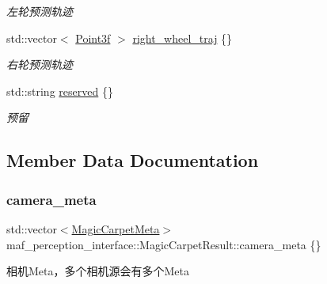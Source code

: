 \begin{DoxyCompactItemize}
\begin{DoxyCompactList}\small\item\em 左轮预测轨迹 \end{DoxyCompactList}\item 
std\+::vector$<$ \hyperlink{structmaf__perception__interface_1_1Point3f}{Point3f} $>$ \hyperlink{structmaf__perception__interface_1_1MagicCarpetResult_a310792355df64c11094628534f79d042}{right\+\_\+wheel\+\_\+traj} \{\}
\begin{DoxyCompactList}\small\item\em 右轮预测轨迹 \end{DoxyCompactList}\item 
std\+::string \hyperlink{structmaf__perception__interface_1_1MagicCarpetResult_aa5ee38fc1e76d77d3baace0530b2afc9}{reserved} \{\}
\begin{DoxyCompactList}\small\item\em 预留 \end{DoxyCompactList}\end{DoxyCompactItemize}


\subsection{Member Data Documentation}
\mbox{\label{structmaf__perception__interface_1_1MagicCarpetResult_a8789b70501b926a9abe9501acf96c323}} 
\subsubsection{\texorpdfstring{camera\+\_\+meta}{camera\_meta}}
{\footnotesize\ttfamily std\+::vector$<$\hyperlink{structmaf__perception__interface_1_1MagicCarpetMeta}{Magic\+Carpet\+Meta}$>$ maf\+\_\+perception\+\_\+interface\+::\+Magic\+Carpet\+Result\+::camera\+\_\+meta \{\}}



相机\+Meta，多个相机源会有多个\+Meta 

\mbox{\label{structmaf__perception__interface_1_1MagicCarpetResult_a98ccdffc14abc9edb82157abfd099df1}} 
